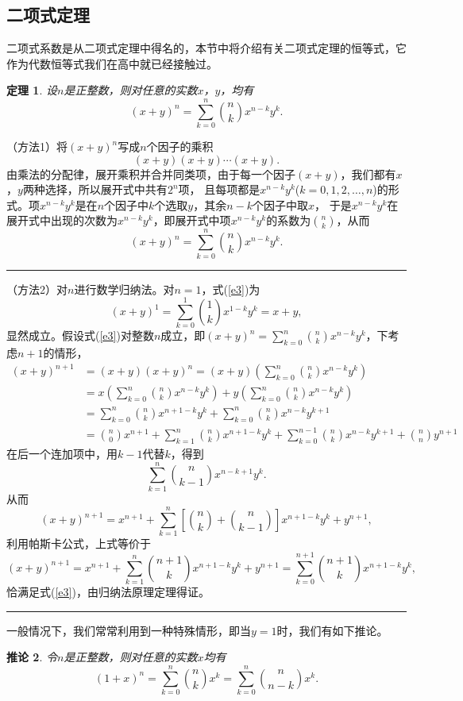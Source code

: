 \documentclass[a4paper,11pt]{article}
\newtheorem{thm}{定理}[section]
\newtheorem{coro}[thm]{推论}
\def\qed{\nopagebreak\hfill{\rule{4pt}{7pt}}\medbreak}
\begin{document}
\subsection{二项式定理}
二项式系数是从二项式定理中得名的，本节中将介绍有关二项式定理的恒等式，它作为代数恒等式我们在高中就已经接触过。
\begin{thm}
设$n$是正整数，则对任意的实数$x$，$y$，均有
\begin{equation}\label{e3}
(x+y)^n=\sum_{k=0}^n{n\choose k}x^{n-k}y^k.
\end{equation}
\end{thm}
（方法1）将$(x+y)^n$写成$n$个因子的乘积$$(x+y)(x+y)\cdots(x+y).$$
由乘法的分配律，展开乘积并合并同类项，由于每一个因子$(x+y)$，我们都有$x$，$y$两种选择，所以展开式中共有$2^n$项，
且每项都是$x^{n-k}y^k$($k=0,1,2,\ldots,n$)的形式。项$x^{n-k}y^k$是在$n$个因子中$k$个选取$y$，其余$n-k$个因子中取$x$，
于是$x^{n-k}y^k$在展开式中出现的次数为$x^{n-k}y^k$，即展开式中项$x^{n-k}y^k$的系数为${n\choose
k}$，从而
$$(x+y)^n=\sum_{k=0}^n{n\choose k}x^{n-k}y^k.$$
\qed
{}（方法2）对$n$进行数学归纳法。对$n=1$，式(\ref{e3})为$$(x+y)^1=\sum_{k=0}^1{1\choose
k}x^{1-k}y^k=x+y,$$
显然成立。假设式(\ref{e3})对整数$n$成立，即$(x+y)^n=\sum_{k=0}^n{n\choose
k}x^{n-k}y^k$，下考虑$n+1$的情形，
\begin{align*}
(x+y)^{n+1}&=(x+y)(x+y)^n=(x+y)\left(\sum_{k=0}^n{n\choose k}x^{n-k}y^k\right)\\
&=x\left(\sum_{k=0}^n{n\choose k}x^{n-k}y^k\right)+y\left(\sum_{k=0}^n{n\choose k}x^{n-k}y^k\right)\\
&=\sum_{k=0}^n{n\choose k}x^{n+1-k}y^k+\sum_{k=0}^n{n\choose k}x^{n-k}y^{k+1}\\
&={n\choose 0}x^{n+1}+\sum_{k=1}^n{n\choose
k}x^{n+1-k}y^{k}+\sum_{k=0}^{n-1}{n\choose
k}x^{n-k}y^{k+1}+{n\choose n}y^{n+1}
\end{align*}
在后一个连加项中，用$k-1$代替$k$，得到
$$\sum_{k=1}^n{n\choose k-1}x^{n-k+1}y^k.$$
从而$$(x+y)^{n+1}=x^{n+1}+\sum_{k=1}^n\left[{n\choose k}+{n\choose
k-1}\right]x^{n+1-k}y^k+y^{n+1},$$
利用帕斯卡公式，上式等价于$$(x+y)^{n+1}=x^{n+1}+\sum_{k=1}^n{n+1\choose
k}x^{n+1-k}y^k+y^{n+1}=\sum_{k=0}^{n+1}{n+1\choose
k}x^{n+1-k}y^k,$$恰满足式(\ref{e3})，由归纳法原理定理得证。 \qed

一般情况下，我们常常利用到一种特殊情形，即当$y=1$时，我们有如下推论。
\begin{coro}
令$n$是正整数，则对任意的实数$x$均有$$(1+x)^n=\sum_{k=0}^n{n\choose
k}x^k=\sum_{k=0}^n{n\choose n-k}x^k.$$
\end{coro}
\end{document}
